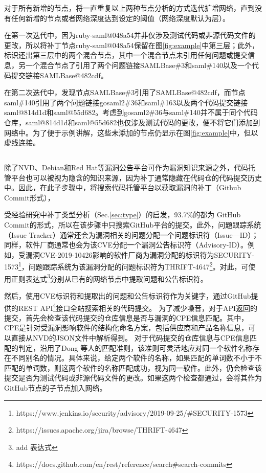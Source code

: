 对于所有新增的节点，\tool 将一直重复以上两种节点分析的方式迭代扩增网络，直到没有任何新增的节点或者网络深度达到设定的阈值（网络深度默认为层）。

\begin{exmp}
在第一次迭代中，因为ruby-saml@048a54并非仅涉及测试代码或非源代码文件的更改，所以\tool 将补丁节点ruby-saml@048a54保留在图\ref{fig:example}中第三层；此外，\tool 标识还出第三层中的两个混合节点，其中一个混合节点未引用任何问题或提交信息，另一个混合节点了引用了两个问题链接SAMLBase\#3和saml\#140以及一个代码提交链接SAMLBase@482cdf。 

在第二次迭代中，\tool 发现节点SAMLBase\#3引用了SAMLBase@482cdf，而节点saml\#140引用了两个问题链接gosaml2\#36和saml\#163以及两个代码提交链接saml@814d1d和saml@55d682。考虑到gosaml2\#36与saml\#140并不属于同个代码仓库，saml@814d1d和saml@55d682也仅涉及测试代码的更改，\tool 便不将它们添加到网络中。为了便于示例讲解，这些未添加的节点仍显示在图\ref{fig:example}中，但以虚线连接。 %
\end{exmp}

\subsection{}
除了NVD、Debian和Red Hat等漏洞公告平台可作为漏洞知识来源之外，代码托管平台也可以被视为隐含的知识来源，因为补丁通常隐藏在代码仓的代码提交历史中。因此，在此子步骤中，\tool 将搜索代码托管平台以获取漏洞的补丁（Github Commit形式），

受经验研究中补丁类型分析（Sec.\ref{sec:type}）的启发，93.7\%的都为 GitHub Commit的形式，所以在该步骤中\tool 只搜索GitHub平台的提交。此外，问题跟踪系统（Issue Tracker）通常还会为漏洞相关的问题分配一个问题标识符（Issue—ID）；同样，软件厂商通常也会为该CVE分配一个漏洞公告标识符（Advisory-ID）。例如，受漏洞CVE-2019-10426影响的软件厂商为漏洞分配的标识符为SECURITY-1573\footnote{https://www.jenkins.io/security/advisory/2019-09-25/\#SECURITY-1573}，问题跟踪系统为该漏洞分配的问题标识符为THRIFT-4647\footnote{https://issues.apache.org/jira/browse/THRIFT-4647}。对此，\tool 可使用正则表达式\footnote{add 表达式}分别从已有的网络节点中提取问题和公告标识符。

然后，\tool 使用CVE标识符和提取出的问题和公告标识符作为关键字，通过GitHub提供的REST API\footnote{https://docs.github.com/en/rest/reference/search\#search-commits}接口全站搜索相关的代码提交。%
为了减少噪音，对于API返回的提交，\tool 首先会检查该代码提交的仓库信息是否与漏洞的CPE信息匹配。其中，CPE是针对受漏洞影响软件的结构化命名方案，包括供应商和产品名称信息，可以直接从NVD的JSON文件中解析得到。
对于代码提交的仓库信息与CPE信息匹配的判定，\tool 沿用了Dong 等人的匹配准则\cite{dong2019towards}，该准则可灵活地应对同一个软件名称存在不同别名的情况。具体来说，给定两个软件的名称，如果匹配的单词数不小于不匹配的单词数，则这两个软件的名称匹配成功，视为同一软件。此外，\tool 仍会检查该提交是否为测试代码或非源代码文件的更改。如果这两个检查都通过，\tool 会将其作为GitHub节点的子节点加入网络。

